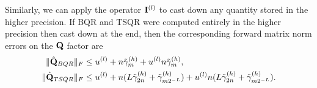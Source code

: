 Similarly, we can apply the operator $\mathbf{I}^{(l)}$ to cast down any quantity stored in the higher precision. 
If BQR and TSQR were computed entirely in the higher precision then cast down at the end, then the corresponding forward matrix norm errors on the $\mathbf{Q}$ factor are
\begin{align*}
	\|\hat{\mathbf{Q}}_{BQR}\|_F&\leq u^{(l)}+n\tilde{\gamma}_m^{(h)} +u^{(l)}n\tilde{\gamma}_m^{(h)},\\
	\|\hat{\mathbf{Q}}_{TSQR}\|_F&\leq u^{(l)}+n(L\tilde{\gamma}_{2n}^{(h)}+\tilde{\gamma}_{m2^{-L}}^{(h)}) +u^{(l)}n(L\tilde{\gamma}_{2n}^{(h)}+\tilde{\gamma}_{m2^{-L}}^{(h)}).
\end{align*}

